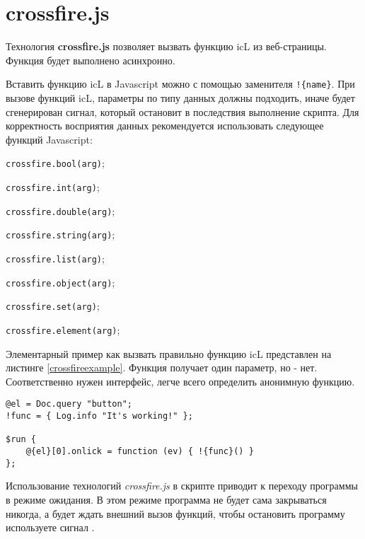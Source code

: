 \section{crossfire.js}

Технология {\bf crossfire.js} позволяет вызвать функцию icL из веб-страницы. Функция будет выполнено асинхронно.

Вставить функцию icL в Javascript можно с помощью заменителя \lstinline|!{name}|. При вызове функций icL, параметры по типу данных должны подходить, иначе будет сгенерирован сигнал, который остановит в последствия выполнение скрипта. Для корректность восприятия данных рекомендуется использовать следующее функций Javascript:
\begin{icItems}
	\item \lstinline|crossfire.bool(arg)|;
	\item \lstinline|crossfire.int(arg)|;
	\item \lstinline|crossfire.double(arg)|;
	\item \lstinline|crossfire.string(arg)|;
	\item \lstinline|crossfire.list(arg)|;
	\item \lstinline|crossfire.object(arg)|;
	\item \lstinline|crossfire.set(arg)|;
	\item \lstinline|crossfire.element(arg)|;
\end{icItems}

Элементарный пример как вызвать правильно функцию icL представлен на листинге \ref{crossfireexample}. Функция  получает один параметр, но  - нет. Соответственно нужен интерфейс, легче всего определить анонимную функцию.

\begin{lstlisting}[caption=Пример вызова функций icL, label=crossfireexample]
@el = Doc.query "button";
!func = { Log.info "It's working!" };

$run {
	@{el}[0].onlick = function (ev) { !{func}() }
};
\end{lstlisting}

Использование технологий \textit{crossfire.js} в скрипте приводит к переходу программы в режиме ожидания. В этом режиме программа не будет сама закрываться никогда, а будет ждать внешний вызов функций, чтобы остановить программу используете сигнал .

